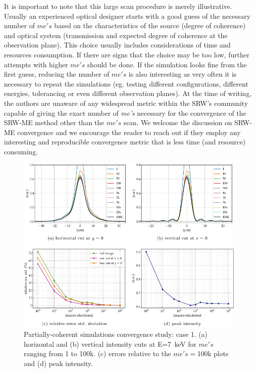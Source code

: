 \documentclass{iucr}              %
\begin{document}
It is important to note that this large scan procedure is merely illustrative. Usually an experienced optical designer starts with a good guess of the necessary number of $me's$ based on the characteristics of the source (degree of coherence) and optical system (transmission and expected degree of coherence at the observation plane). This choice usually includes considerations of time and resources consumption. If there are signs that the choice may be too low, further attempts with higher $me's$ should be done. If the simulation looks fine from the first guess, reducing the number of $me's$ is also interesting as very often it is necessary to repeat the simulations (eg. testing different configurations, different energies, tolerancing or even different observation planes). At the time of writing, the authors are unaware of any widespread metric within the SRW's community capable of giving the exact number of \textit{me's} necessary for the convergence of the SRW-ME method other than the $me's$ scan. We welcome the discussion on SRW-ME convergence and we encourage the reader to reach out if they employ any interesting and reproducible convergence metric that is less time (and resource) consuming.

\begin{figure}
    \centering
    \includegraphics[width=\textwidth]{figures/c1.pdf}
    \caption{Partially-coherent simulations convergence study: case 1. (a) horizontal and (b) vertical intensity cuts at E=7~keV for $me's$ ranging from 1 to 100k. (c) errors relative to the $me's=$100k plots and (d) peak intensity.}
    \label{fig:me_c1}
\end{figure}
\end{document}
